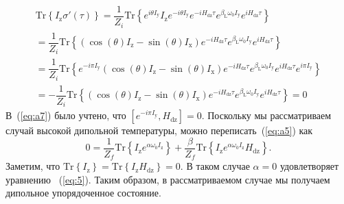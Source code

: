 \documentclass[utf8]{jetp}
\newcommand{\tr}[1]{\mathrm{Tr} \left\{ #1 \right\}}
\newcommand{\sx}{I_\mathrm{x}}
\newcommand{\sy}{I_\mathrm{y}}
\newcommand{\sz}{I_\mathrm{z}}
\newcommand{\hdz}{H_\mathrm{dz}}
\begin{document}
\begin{multline}
    \label{eq:a7} 
    \tr{I_\mathrm{z} \sigma'(\tau)}
    =  \dfrac{1}{Z_{i}} \tr{
        e^{i \theta \sy} \sz e^{-i \theta \sy}
        e^{-i \hdz \tau} e^{\beta_\mathrm{L} \omega_{0} \sy} e^{i \hdz \tau}
    } 
    \\
    = \dfrac{1}{Z_i} \tr{
        \left( \cos(\theta) \sz - \sin(\theta) \sx \right) 
        e^{-i \hdz \tau} e^{\beta_\mathrm{L} \omega_{0} \sy} e^{i \hdz \tau}
    }
    \\
    = \dfrac{1}{Z_i} \tr{
        e^{-i \pi \sy}  
        \left( \cos(\theta) \sz - \sin(\theta) \sx \right) 
        e^{-i \hdz \tau} e^{\beta_\mathrm{L} \omega_{0} \sy} e^{i \hdz \tau}
        e^{i \pi \sy}  
    }
    \\
    = - \dfrac{1}{Z_i} \tr{
        \left( \cos(\theta) \sz - \sin(\theta) \sx \right) 
        e^{-i \hdz \tau} e^{\beta_\mathrm{L} \omega_{0} \sy} e^{i \hdz \tau} 
    } = 0
\end{multline}
%
В~(\ref{eq:a7}) было учтено, что $\left[ e^{-i \pi \sy}, \hdz \right] = 0$.
Поскольку мы рассматриваем случай высокой дипольной температуры, можно переписать~(\ref{eq:a5}) как 
\begin{equation}
    \label{eq:a8}
    0 = \dfrac{1}{Z_f} \tr{ \sz e^{\alpha \omega_0 \sz}}
    + \dfrac{\beta}{Z_f} \tr{\sz e^{\alpha \omega_0 \sz} \hdz}.
\end{equation}
%
Заметим, что $\tr{\sz} = \tr{\sz\hdz} = 0$. В таком случае $\alpha = 0$ удовлетворяет уравнению ~(\ref{eq:5}). 
Таким образом, в рассматриваемом случае мы получаем дипольное упорядоченное состояние.


\end{document}
